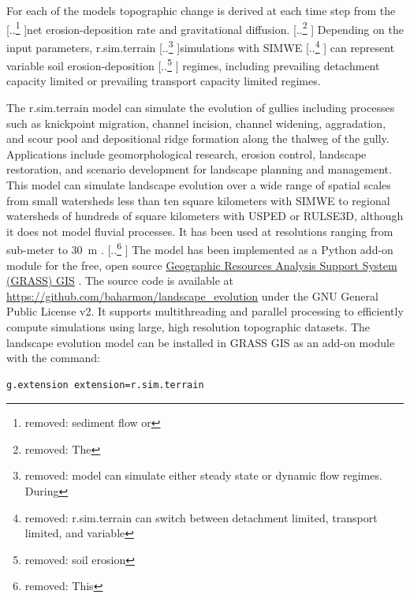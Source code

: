 \documentclass[gmd, manuscript]{copernicus}
\providecommand{\DIFadd}[1]{{\protect\color{blue} \sf #1}} %
\providecommand{\DIFdel}[1]{{\protect\color{red} [..\footnote{removed: #1} ]}} %
\providecommand{\DIFaddbegin}{} %
\providecommand{\DIFaddend}{} %
\providecommand{\DIFdelbegin}{} %
\providecommand{\DIFdelend}{} %
\begin{document}
For each of the models 
topographic change is derived at each time step
from the \DIFdelbegin \DIFdel{sediment flow or }\DIFdelend net erosion-deposition rate
and gravitational diffusion.
\DIFdelbegin \DIFdel{The }\DIFdelend \DIFaddbegin \DIFadd{Depending on the input parameters, 
}\DIFaddend r.sim.terrain \DIFdelbegin \DIFdel{model
can simulate either steady state or dynamic flow regimes.
During }\DIFdelend simulations with SIMWE 
\DIFdelbegin \DIFdel{r.sim.terrain
can switch between 
detachment limited, transport limited, and variable }\DIFdelend \DIFaddbegin \DIFadd{can represent variable soil }\DIFaddend erosion-deposition \DIFdelbegin \DIFdel{soil erosion }\DIFdelend \DIFaddbegin \DIFadd{regimes, 
including prevailing detachment capacity limited 
or prevailing transport capacity limited }\DIFaddend regimes.

The r.sim.terrain model
can simulate the evolution of gullies
including processes such as 
knickpoint migration,
channel incision, 
channel widening, 
aggradation, and
scour pool and 
depositional ridge formation
along the thalweg of the gully. 
Applications include 
geomorphological research,
erosion control, 
landscape restoration, 
and scenario development 
for landscape planning and management.
This model can simulate landscape evolution 
over a wide range of spatial scales 
from small watersheds 
less than ten square kilometers
with SIMWE
to regional watersheds
of hundreds of square kilometers
with USPED or RULSE3D,
although it does not model fluvial processes. 
\DIFaddbegin \DIFadd{It has been used at resolutions ranging from sub-meter to 30~}\unit{m}\DIFadd{.
}\DIFaddend %
\DIFdelbegin \DIFdel{This }\DIFdelend \DIFaddbegin \DIFadd{The }\DIFaddend model has been implemented 
as a Python add-on module 
for the free, open source
\href{https://grass.osgeo.org/}{Geographic Resources Analysis Support System (GRASS) GIS}
\citep{GRASS}. 
The source code is available at 
\url{https://github.com/baharmon/landscape\_evolution} 
under the GNU General Public License v2.
It supports multithreading and parallel processing
to efficiently compute simulations 
using large, high resolution topographic datasets.
%
The landscape evolution model 
can be installed in GRASS GIS as an add-on module 
with the command: 
\begin{verbatim}
g.extension extension=r.sim.terrain
\end{verbatim}


\end{document}
